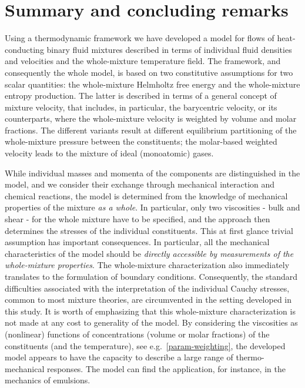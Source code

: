 \documentclass[a4paper]{article}
\begin{document}
\section{Summary and concluding remarks}
\label{sec-summary}
Using a thermodynamic framework we have developed a model for flows of heat-conducting binary fluid mixtures described in terms of individual fluid densities and velocities and the whole-mixture temperature field. The framework, and consequently the whole model, is based on two constitutive assumptions for two scalar quantities: the whole-mixture Helmholtz free energy and the whole-mixture entropy production. The latter is described  in terms of a general concept of mixture velocity, that includes, in particular, the barycentric velocity, or its counterparts, where the whole-mixture velocity is weighted by volume and molar fractions. The different variants result at different equilibrium partitioning of the whole-mixture pressure between the constituents; the molar-based weighted velocity leads to the mixture of ideal (monoatomic) gases.

While individual masses and momenta of the components are distinguished in the model, and we consider their exchange through mechanical interaction and chemical reactions, the model is determined from the knowledge of mechanical properties of the mixture {\it as a whole}. In particular, only two viscosities - bulk and shear - for the whole mixture have to be specified, and the approach then determines the stresses of the individual constituents. This at first glance trivial assumption has important consequences. In particular, all the mechanical characteristics of the model should be {\it directly accessible by measurements of the whole-mixture properties}. The whole-mixture characterization also immediately translates to the formulation of boundary conditions. Consequently, the standard difficulties associated with the interpretation of the individual Cauchy stresses, common to most mixture theories, are circumvented in the setting developed in this study. It is worth of emphasizing that this whole-mixture characterization is not made at any cost to generality of the model. By considering the viscosities as (nonlinear) functions of concentrations (volume or molar fractions) of the constituents (and the temperature), see e.g.~\eqref{param-weighting}, the developed model appears to have the capacity to describe a large range of thermo-mechanical responses. The model can find the application, for instance, in the mechanics of emulsions. %
\end{document}
